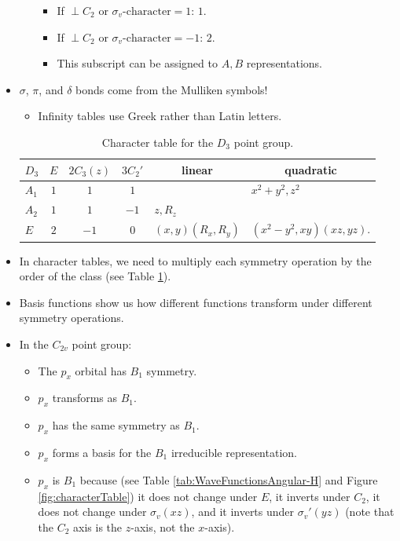 \documentclass[../notes.tex]{subfiles}
\begin{document}
\begin{itemize}
\begin{itemize}
\begin{itemize}
            \item If $\perp C_2\text{ or }\sigma_v\text{-character}=1$: $1$.
            \item If $\perp C_2\text{ or }\sigma_v\text{-character}=-1$: $2$.
            \item This subscript can be assigned to $A,B$ representations.
        \end{itemize}
    \end{itemize}
    \item $\sigma$, $\pi$, and $\delta$ bonds come from the Mulliken symbols!
    \begin{itemize}
        \item Infinity tables use Greek rather than Latin letters.
    \end{itemize}
    \begin{table}[h!]
        \centering
        \renewcommand{\arraystretch}{1.2}
        \small
        \begin{tabular}{l|ccc|l|l}
            $D_3$ & $E$ & $2C_3(z)$ & $3C_2'$ & \multicolumn{1}{c|}{linear} & \multicolumn{1}{c}{quadratic}\\
            \hline
            $A_1$ & $1$ & $1$ & $1$ & & $x^2+y^2,z^2$\\
            $A_2$ & $1$ & $1$ & $-1$ & $z,R_z$ & \\
            $E$ & $2$ & $-1$ & $0$ & $(x,y)(R_x,R_y)$ & $(x^2-y^2,xy)(xz,yz)$.
        \end{tabular}
        \caption{Character table for the $D_3$ point group.}
        \label{tab:characterTable-D3}
    \end{table}
    \item In character tables, we need to multiply each symmetry operation by the order of the class (see Table \ref{tab:characterTable-D3}).
    \item Basis functions show us how different functions transform under different symmetry operations.
    \item In the $C_{2v}$ point group:
    \begin{itemize}
        \item The $p_x$ orbital has $B_1$ symmetry.
        \item $p_x$ transforms as $B_1$.
        \item $p_x$ has the same symmetry as $B_1$.
        \item $p_x$ forms a basis for the $B_1$ irreducible representation.
        \item $p_x$ is $B_1$ because (see Table \ref{tab:WaveFunctionsAngular-H} and Figure \ref{fig:characterTable}) it does not change under $E$, it inverts under $C_2$, it does not change under $\sigma_v(xz)$, and it inverts under $\sigma_v'(yz)$ (note that the $C_2$ axis is the $z$-axis, not the $x$-axis).

\end{itemize}
\end{itemize}
\end{document}
